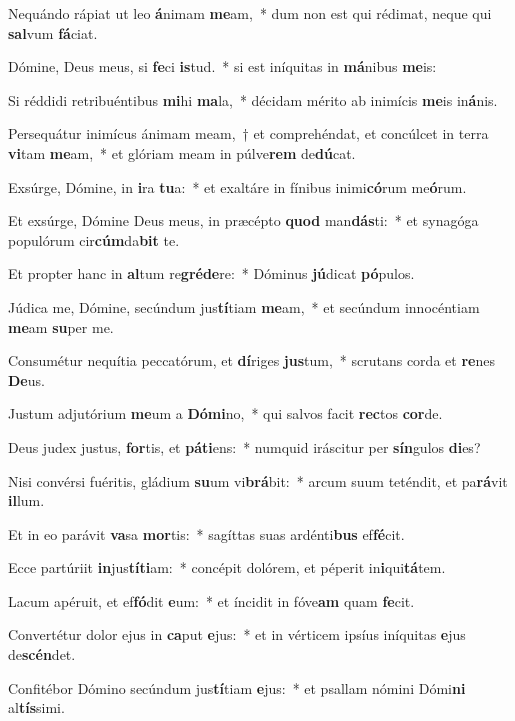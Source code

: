 \item Nequándo rápiat ut leo \textbf{á}nimam \textbf{me}am,~* dum non est qui rédimat, neque qui \textbf{sal}vum \textbf{fá}ciat.
\item Dómine, Deus meus, si \textbf{fe}ci \textbf{is}tud.~* si est iníquitas in \textbf{má}nibus \textbf{me}is:
\item Si réddidi retribuéntibus \textbf{mi}hi \textbf{ma}la,~* décidam mérito ab inimícis \textbf{me}is in\textbf{á}nis.
\item Persequátur inimícus ánimam meam,~† et comprehéndat, et concúlcet in terra \textbf{vi}tam \textbf{me}am,~* et glóriam meam in púlve\textbf{rem} de\textbf{dú}cat.
\item Exsúrge, Dómine, in \textbf{i}ra \textbf{tu}a:~* et exaltáre in fínibus inimi\textbf{có}rum me\textbf{ó}rum.
\item Et exsúrge, Dómine Deus meus, in præcépto \textbf{quod} man\textbf{dás}ti:~* et synagóga populórum cir\textbf{cúm}da\textbf{bit} te.
\item Et propter hanc in \textbf{al}tum re\textbf{gré}\textbf{de}re:~* Dóminus \textbf{jú}dicat \textbf{pó}pulos.
\item Júdica me, Dómine, secúndum jus\textbf{tí}tiam \textbf{me}am,~* et secúndum innocéntiam \textbf{me}am \textbf{su}per me.
\item Consumétur nequítia peccatórum, et \textbf{dí}riges \textbf{jus}tum,~* scrutans corda et \textbf{re}nes \textbf{De}us.
\item Justum adjutórium \textbf{me}um a \textbf{Dó}\textbf{mi}no,~* qui salvos facit \textbf{rec}tos \textbf{cor}de.
\item Deus judex justus, \textbf{for}tis, et \textbf{pá}\textbf{ti}ens:~* numquid iráscitur per \textbf{sín}gulos \textbf{di}es?
\item Nisi convérsi fuéritis, gládium \textbf{su}um vi\textbf{brá}bit:~* arcum suum teténdit, et pa\textbf{rá}vit \textbf{il}lum.
\item Et in eo parávit \textbf{va}sa \textbf{mor}tis:~* sagíttas suas ardénti\textbf{bus} ef\textbf{fé}cit.
\item Ecce partúriit \textbf{in}jus\textbf{tí}\textbf{ti}am:~* concépit dolórem, et péperit in\textbf{i}qui\textbf{tá}tem.
\item Lacum apéruit, et ef\textbf{fó}dit \textbf{e}um:~* et íncidit in fóve\textbf{am} quam \textbf{fe}cit.
\item Convertétur dolor ejus in \textbf{ca}put \textbf{e}jus:~* et in vérticem ipsíus iníquitas \textbf{e}jus de\textbf{scén}det.
\item Confitébor Dómino secúndum jus\textbf{tí}tiam \textbf{e}jus:~* et psallam nómini Dómi\textbf{ni} al\textbf{tís}simi.
